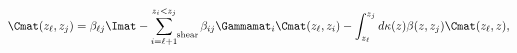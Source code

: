 \begin{equation}
\Cmat(z_\ell, z_j) = \beta_{\ell j}\Imat - \sum\limits_{i =\ell +1}^{z_i < z_j}\mathop{}_{\mkern-5mu \rm{shear}} \beta_{ij} \Gammamat_i \Cmat(z_\ell, z_i) \\
- \int_{z_\ell}^{z_j} d\kappa(z) \beta(z, z_j) \Cmat(z_\ell, z),
\end{equation}
  